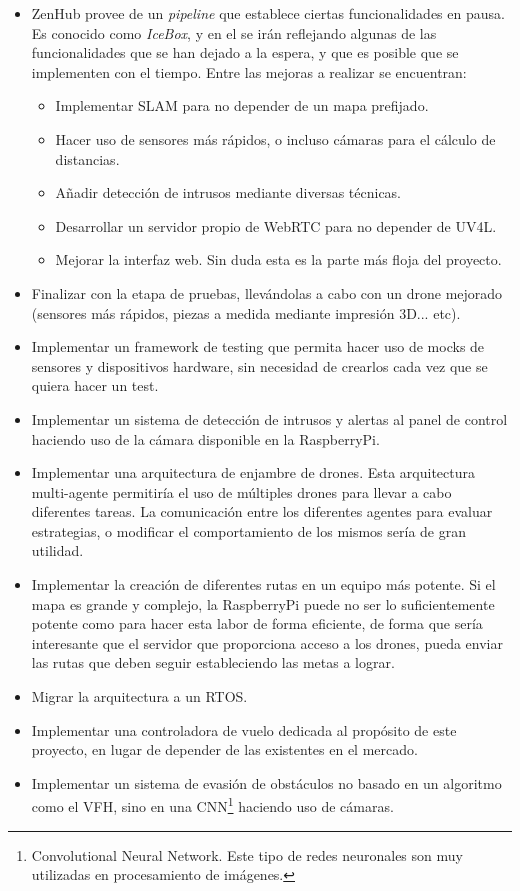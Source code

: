 \begin{itemize}
\item ZenHub provee de un \textit{pipeline} que establece ciertas funcionalidades en pausa. Es conocido como \emph{IceBox}, y en el se irán reflejando algunas de las funcionalidades que se han dejado a la espera, y que es posible que se implementen con el tiempo. Entre las mejoras a realizar se encuentran:
\begin{itemize}
\item Implementar SLAM para no depender de un mapa prefijado.
\item Hacer uso de sensores más rápidos, o incluso cámaras para el cálculo de distancias.
\item Añadir detección de intrusos mediante diversas técnicas.
\item Desarrollar un servidor propio de WebRTC para no depender de UV4L.
\item Mejorar la interfaz web. Sin duda esta es la parte más floja del proyecto.
\end{itemize}
\item Finalizar con la etapa de pruebas, llevándolas a cabo con un drone mejorado (sensores más rápidos, piezas a medida mediante impresión 3D... etc).
\item Implementar un framework de testing que permita hacer uso de mocks de sensores y dispositivos hardware, sin necesidad de crearlos cada vez que se quiera hacer un test.
\item Implementar un sistema de detección de intrusos y alertas al panel de control haciendo uso de la cámara disponible en la RaspberryPi. 
\item Implementar una arquitectura de enjambre de drones. Esta arquitectura multi-agente permitiría el uso de múltiples drones para llevar a cabo diferentes tareas. La comunicación entre los diferentes agentes para evaluar estrategias, o modificar el comportamiento de los mismos sería de gran utilidad. 
\item Implementar la creación de diferentes rutas en un equipo más potente. Si el mapa es grande y complejo, la RaspberryPi puede no ser lo suficientemente potente como para hacer esta labor de forma eficiente, de forma que sería interesante que el servidor que proporciona acceso a los drones, pueda enviar las rutas que deben seguir estableciendo las metas a lograr.
\item Migrar la arquitectura a un RTOS. 
\item Implementar una controladora de vuelo dedicada al propósito de este proyecto, en lugar de depender de las existentes en el mercado.
\item Implementar un sistema de evasión de obstáculos no basado en un algoritmo como el VFH, sino en una CNN\footnote{Convolutional Neural Network. Este tipo de redes neuronales son muy utilizadas en procesamiento de imágenes.} haciendo uso de cámaras.
\end{itemize}